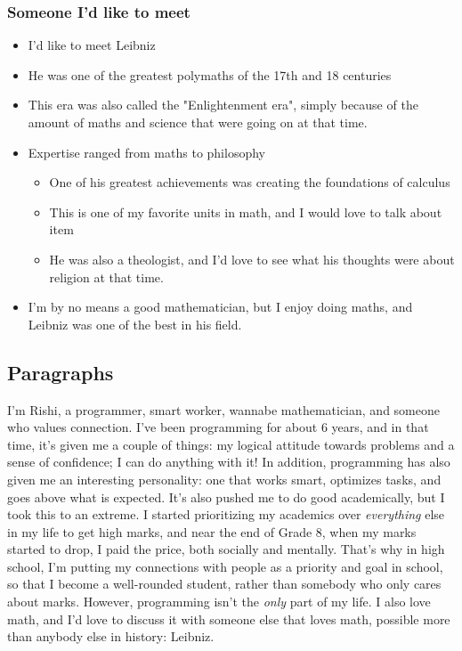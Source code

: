 \documentclass[]{article}
\begin{document}
\subsubsection*{Someone I'd like to meet}
\begin{itemize}
    \item I'd like to meet Leibniz
    \item He was one of the greatest polymaths of the 17th and 18 centuries
    \item This era was also called the "Enlightenment era", simply because of the amount of maths and science that were going on at that time.
    \item Expertise ranged from maths to philosophy
    \begin{itemize}
        \item One of his greatest achievements was creating the foundations of calculus
        \item This is one of my favorite units in math, and I would love to talk about item
        \item He was also a theologist, and I'd love to see what his thoughts were about religion at that time.
    \end{itemize}
    \item I'm by no means a good mathematician, but I enjoy doing maths, and Leibniz was one of the best in his field.
\end{itemize}

\newpage

\subsection*{Paragraphs}

I'm Rishi, a programmer, smart worker, wannabe mathematician, and someone who values connection. I've been programming for about 6 years, and in that time, it's given me a couple of things: my logical attitude towards problems and a sense of confidence; I can do anything with it! In addition, programming has also given me an interesting personality: one that works smart, optimizes tasks, and goes above what is expected. It's also pushed me to do good academically, but I took this to an extreme. I started prioritizing my academics over \textit{everything} else in my life to get high marks, and near the end of Grade 8, when my marks started to drop, I paid the price, both socially and mentally. That's why in high school, I'm putting my connections with people as a priority and goal in school, so that I become a well-rounded student, rather than somebody who only cares about marks. However, programming isn't the \textit{only} part of my life. I also love math, and I'd love to discuss it with someone else that loves math, possible more than anybody else in history: Leibniz.
\newline
\end{document}
